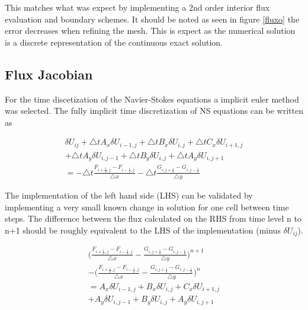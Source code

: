 \documentclass[paper=a4, fontsize=11pt, abstract=on]{scrartcl}
\numberwithin{equation}{section}		%
\numberwithin{figure}{section}			%
\numberwithin{table}{section}				%
\begin{document}
This matches what was expect by implementing a 2nd order interior flux evaluation and boundary schemes. It should be noted as seen in figure \ref{fluxo} the error decreases when refining the mesh. This is expect as the numerical solution is a discrete representation of the continuous exact solution. 

 
\subsection{Flux Jacobian}
For the time discetization of the Navier-Stokes equations a implicit euler method was selected. The fully implicit time discretization of NS equations can be written as 


 \begin{equation}
  \begin{aligned}
\delta U_{ij} + \triangle t A_x \delta U_{i-1,j} + \triangle t B_x \delta U_{i,j} + \triangle t C_x \delta U_{i+1,j}\\
  +\triangle t A_y \delta U_{i,j-1} + \triangle t B_y \delta U_{i,j} + \triangle t A_y \delta U_{i,j+1} \\
  = -\triangle t \frac{F_{i+\frac{1}{2},j}-F_{i-\frac{1}{2},j}}{\triangle x} -\triangle t \frac{G_{i, j+\frac{1}{2}}-G_{i,j-\frac{1}{2}}}{\triangle y}
 \end{aligned}
 \label{m1} 
\end{equation}

The implementation of the left hand side (LHS) can be validated by implementing a very small known change in solution for one cell between time steps. The difference between the flux calculated on the RHS from time level n to n+1 should be roughly equivalent to the LHS of the implementation (minus $\delta U_{ij}$). 



 \begin{equation}
  \begin{aligned}
 \Bigg( \frac{F_{i+\frac{1}{2},j}-F_{i-\frac{1}{2},j}}{\triangle x} - \frac{G_{i, j+\frac{1}{2}}-G_{i,j-\frac{1}{2}}}{\triangle y}\Bigg)^{n+1}
  \\ -\Bigg( \frac{F_{i+\frac{1}{2},j}-F_{i-\frac{1}{2},j}}{\triangle x} - \frac{G_{i, j+\frac{1}{2}}-G_{i,j-\frac{1}{2}}}{\triangle y}\Bigg)^{n} \\
   = A_x \delta U_{i-1,j} +  B_x \delta U_{i,j} +  C_x \delta U_{i+1,j}\\
  + A_y \delta U_{i,j-1} +  B_y \delta U_{i,j} +  A_y \delta U_{i,j+1}
 \end{aligned}
\end{equation}
\end{document}
